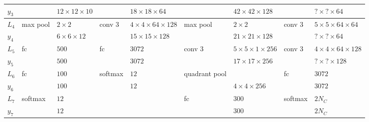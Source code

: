 \documentclass[11pt,twoside]{report}
\begin{document}
\begin{table}[h!]
{\begin{tabular}{|lllllllll|}
\multicolumn{1}{|l|}{$y_3$}   &          & \multicolumn{1}{l|}{$12\times 12 \times 10$}       &          & \multicolumn{1}{l|}{$18 \times 18\times64$}          &               & \multicolumn{1}{l|}{$42\times42\times128$}       &           & $?\times?\times64$             \\ \hline
\multicolumn{1}{|l|}{$L_4$}   & max pool & \multicolumn{1}{l|}{$2\times 2$}                   & conv 3   & \multicolumn{1}{l|}{$4\times 4 \times64 \times 128$} & max pool      & \multicolumn{1}{l|}{$2\times2$}                  & conv 3    & $5\times5\times64\times64$     \\
\multicolumn{1}{|l|}{$y_4$}   &          & \multicolumn{1}{l|}{$6\times 6 \times 12$}         &          & \multicolumn{1}{l|}{$15\times15\times128$}           &               & \multicolumn{1}{l|}{$21\times21\times128$}       &           & $?\times?\times64$             \\ \hline
\multicolumn{1}{|l|}{$L_5$}   & fc       & \multicolumn{1}{l|}{$500$}                         & fc       & \multicolumn{1}{l|}{$3072$}                          & conv 3        & \multicolumn{1}{l|}{$5\times5\times1\times256$}  & conv 3    & $4\times4\times64\times128$    \\
\multicolumn{1}{|l|}{$y_5$}   &          & \multicolumn{1}{l|}{$500$}                         &          & \multicolumn{1}{l|}{$3072$}                          &               & \multicolumn{1}{l|}{$17\times17\times256$}       &           & $?\times?\times128$            \\ \hline
\multicolumn{1}{|l|}{$L_6$}   & fc       & \multicolumn{1}{l|}{$100$}                         & softmax  & \multicolumn{1}{l|}{$12$}                            & quadrant pool & \multicolumn{1}{l|}{}                            & fc        & $3072$                         \\
\multicolumn{1}{|l|}{$y_6$}   &          & \multicolumn{1}{l|}{$100$}                         &          & \multicolumn{1}{l|}{$12$}                            &               & \multicolumn{1}{l|}{$4\times4\times256$}         &           & $3072$                         \\ \hline
\multicolumn{1}{|l|}{$L_7$}   & softmax  & \multicolumn{1}{l|}{$12$}                          &          & \multicolumn{1}{l|}{}                                & fc            & \multicolumn{1}{l|}{$300$}                       & softmax   & $2N_{C}$                       \\
\multicolumn{1}{|l|}{$y_7$}   &          & \multicolumn{1}{l|}{$12$}                          &          & \multicolumn{1}{l|}{}                                &               & \multicolumn{1}{l|}{$300$}                       &           & $2N_{C}$                       \\ \hline

\end{tabular}}
\end{table}
\end{document}
